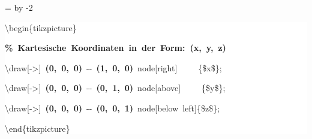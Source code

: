 \begingroup
\ttfamily
{}
=\textwidth
\advance{} by -2\fboxsep
\noindent
\colorbox{background}
{%
\parbox{\dimen255}
{%
\rule[-0.5ex]{0pt}{2.5ex}\hspace*{0.0em}\textbackslash{}begin\{tikzpicture\}\\
\rule[-0.5ex]{0pt}{2.5ex}\hspace*{1.0em}\textcolor{G}{\textbf{\%~Kartesische~Koordinaten~in~der~Form:~(x,~y,~z)}}\\
\rule[-0.5ex]{0pt}{2.5ex}\hspace*{1.0em}\textbackslash{}draw[{-}{>}]~\textcolor{R}{\textbf{(0,~0,~0)}}~{-}{-}~\textcolor{R}{\textbf{(1,~0,~0)}}~node[right]~~~~~\{\$x\$\};\\
\rule[-0.5ex]{0pt}{2.5ex}\hspace*{1.0em}\textbackslash{}draw[{-}{>}]~\textcolor{R}{\textbf{(0,~0,~0)}}~{-}{-}~\textcolor{R}{\textbf{(0,~1,~0)}}~node[above]~~~~~\{\$y\$\};\\
\rule[-0.5ex]{0pt}{2.5ex}\hspace*{1.0em}\textbackslash{}draw[{-}{>}]~\textcolor{R}{\textbf{(0,~0,~0)}}~{-}{-}~\textcolor{R}{\textbf{(0,~0,~1)}}~node[below~left]\{\$z\$\};\\
\rule[-0.5ex]{0pt}{2.5ex}\hspace*{0.0em}\textbackslash{}end\{tikzpicture\}}%
}%
\endgroup
